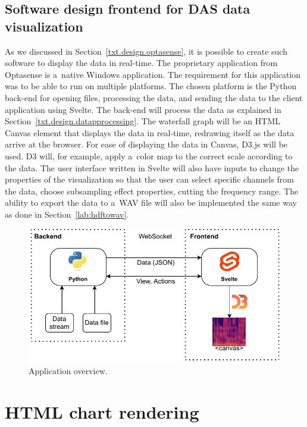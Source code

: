 

\subsection{Software design frontend for DAS data visualization}\label{txt.design.frontend.dataviz}

As we discussed in Section~\ref{txt.design.optasense}, it is possible to create such software to display the data in real-time. The proprietary application from Optasense is a~native Windows application. The requirement for this application was to be able to run on multiple platforms. The chosen platform is the Python back-end for opening files, processing the data, and sending the data to the client application using Svelte. The back-end will process the data as explained in Section~\ref{txt.design.datapprocessing}. The waterfall graph will be an HTML Canvas element that displays the data in real-time, redrawing itself as the data arrive at the browser. For ease of displaying the data in Canvas, D3.js will be used. D3 will, for example, apply a~color map to the correct scale according to the data. The user interface written in Svelte will also have inputs to change the properties of the visualization so that the user can select specific channels from the data, choose subsampling effect properties, cutting the frequency range. The ability to export the data to a~WAV file will also be implemented the same way as done in Section~\ref{lab:hdftowav}.

\begin{figure}[h]
    \centering
    \includegraphics{obrazky/appstack.drawio.pdf}
    \caption{Application overview.}
    \label{fig:app_overview}
\end{figure}


\section{HTML chart rendering}

